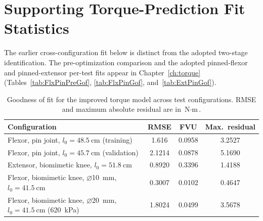 \section{Supporting Torque-Prediction Fit Statistics}\label{sec:app_torque_fit_details}

The earlier cross-configuration fit below is distinct from the adopted two-stage identification. The pre-optimization comparison and the adopted pinned-flexor and pinned-extensor per-test fits appear in Chapter~\ref{ch:torque} (Tables~\ref{tab:FlxPinPreGof}, \ref{tab:FlxPinGof}, and~\ref{tab:ExtPinGof}).

\begin{table}[htbp]
\centering\small
\caption{Goodness of fit for the improved torque model across test configurations. RMSE and maximum absolute residual are in $\text{N}\cdot\text{m}$.}
\label{tab:TorqueFit}
\begin{tabular}{@{}lccc@{}}
\toprule
\textbf{Configuration} & \textbf{RMSE} & \textbf{FVU} & \textbf{Max.\ residual} \\
\midrule
Flexor, pin joint, $l_{0}=\qty{48.5}{\cm}$ (training) & 1.616 & 0.0958 & 3.2527 \\
Flexor, pin joint, $l_{0}=\qty{45.7}{\cm}$ (validation) & 2.1214 & 0.0878 & 5.1690 \\
Extensor, biomimetic knee, $l_{0}=\qty{51.8}{\cm}$ & 0.8920 & 0.3396 & 1.4188 \\
Flexor, biomimetic knee, $\diameter$\qty{10}{\mm}, $l_{0}=\qty{41.5}{\cm}$ & 0.3007 & 0.0102 & 0.4647 \\
Flexor, biomimetic knee, $\diameter$\qty{20}{\mm}, $l_{0}=\qty{41.5}{\cm}$ (\qty{620}{\kPa}) & 1.8024 & 0.0499 & 3.5678 \\
\bottomrule
\end{tabular}
\end{table}
